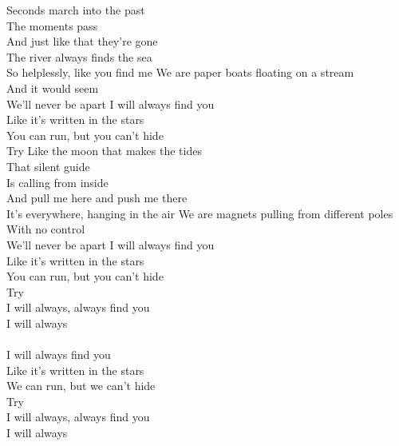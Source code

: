 \clearpage
{}

Seconds march into the past \tab{}\\
The moments pass \tab{}\\
And just like that they're gone \\
The river always finds the sea \tab{}\\
So helplessly, like you find me \tab{}
\hops
We are paper boats floating on a stream \\
And it would seem \tab{}\\
We'll never be apart \tab{}
\hops
I will always find you\tab{}\\
Like it's written in the stars \tab{}\\
You can run, but you can't hide\\
Try \tab{}\tab{}
\hops
Like the moon that makes the tides\\
That silent guide\\
Is calling from inside\\
And pull me here and push me there\\
It's everywhere, hanging in the air
\hops
We are magnets pulling from different poles\\
With no control\\
We'll never be apart
\hops
I will always find you\\
Like it's written in the stars\\
You can run, but you can't hide\\
Try
\hops
{}\\
I will always, always find you \tab{}\\
I will always \tab{}\tab{}\\
\hops
{}\\
I will always find you\\
Like it's written in the stars\\
We can run, but we can't hide\\
Try\\
\hops
I will always, always find you\\
I will always